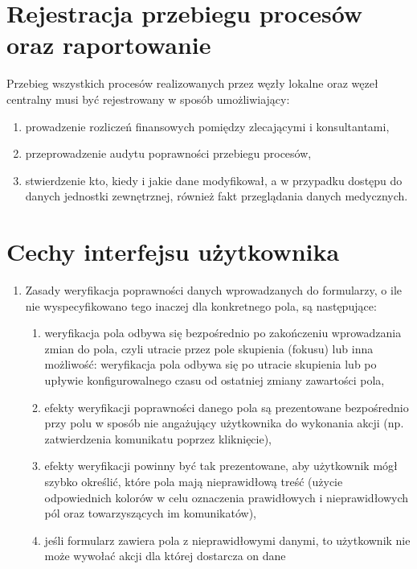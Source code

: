 \documentclass[a4paper]{report}
\begin{document}
\section{Rejestracja przebiegu procesów oraz raportowanie}

Przebieg wszystkich procesów realizowanych przez węzły lokalne oraz węzeł 
centralny musi być rejestrowany w sposób umożliwiający: 
\begin{enumerate}
  \item prowadzenie rozliczeń finansowych pomiędzy zlecającymi i konsultantami,
  \item przeprowadzenie audytu poprawności przebiegu procesów,
  \item stwierdzenie kto, kiedy i jakie dane modyfikował, a w przypadku dostępu do danych
  jednostki zewnętrznej, również fakt przeglądania danych medycznych.
\end{enumerate}

\section{Cechy interfejsu użytkownika}

\begin{enumerate}
  \item Zasady weryfikacja poprawności danych wprowadzanych do formularzy, o ile
  nie wyspecyfikowano tego inaczej dla konkretnego pola, są następujące:
  \begin{enumerate}
    \item weryfikacja pola odbywa się bezpośrednio po zakończeniu wprowadzania zmian do pola, czyli utracie przez pole skupienia (fokusu)
    lub inna możliwość: weryfikacja pola odbywa się po utracie skupienia lub po upływie konfigurowalnego czasu od ostatniej zmiany zawartości pola,
    \item efekty weryfikacji poprawności danego pola są prezentowane bezpośrednio przy polu w sposób nie angażujący użytkownika do wykonania
    akcji (np. zatwierdzenia komunikatu poprzez kliknięcie),
    \item efekty weryfikacji powinny być tak prezentowane, aby użytkownik mógł szybko określić, które pola mają
    nieprawidłową treść (użycie odpowiednich kolorów w celu oznaczenia prawidłowych i nieprawidłowych pól oraz towarzyszących
    im komunikatów),
    \item jeśli formularz zawiera pola z nieprawidłowymi danymi, to użytkownik nie może wywołać akcji dla której dostarcza on dane
  \end{enumerate}

\end{enumerate}
\end{document}
